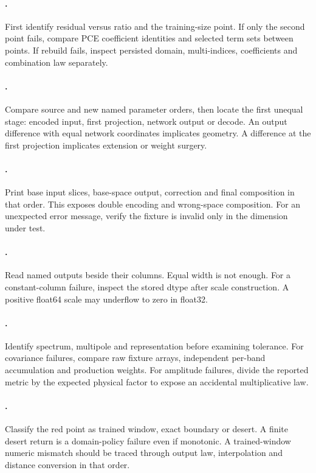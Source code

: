 \paragraph{.}
First identify residual versus ratio and the training-size point.  If only the
second point fails, compare PCE coefficient identities and selected term sets
between points.  If rebuild fails, inspect persisted domain, multi-indices,
coefficients and combination law separately.

\paragraph{.}
Compare source and new named parameter orders, then locate the first unequal
stage: encoded input, first projection, network output or decode.  An output
difference with equal network coordinates implicates geometry.  A difference
at the first projection implicates extension or weight surgery.

\paragraph{.}
Print base input slices, base-space output, correction and final composition
in that order.  This exposes double encoding and wrong-space composition.
For an unexpected error message, verify the fixture is invalid only in the
dimension under test.

\paragraph{.}
Read named outputs beside their columns.  Equal width is not enough.  For a
constant-column failure, inspect the stored dtype after scale construction.
A positive float64 scale may underflow to zero in float32.

\paragraph{.}
Identify spectrum, multipole and representation before examining tolerance.
For covariance failures, compare raw fixture arrays, independent per-band
accumulation and production weights.  For amplitude failures, divide the
reported metric by the expected physical factor to expose an accidental
multiplicative law.

\paragraph{.}
Classify the red point as trained window, exact boundary or desert.  A finite
desert return is a domain-policy failure even if monotonic.  A trained-window
numeric mismatch should be traced through output law, interpolation and
distance conversion in that order.

